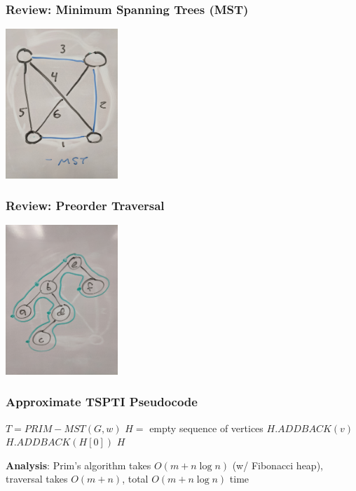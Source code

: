 \documentclass{beamer}
\begin{document}
\begin{frame} \frametitle{Review: Minimum Spanning Trees (MST)}
  \begin{center}
    \includegraphics[height=160pt]{13-mst.jpg}
  \end{center}
\end{frame}

\begin{frame} \frametitle{Review: Preorder Traversal}
  \begin{center}
    \includegraphics[height=160pt]{13-preorder.jpg}
  \end{center}
\end{frame}

\begin{frame} \frametitle{Approximate TSPTI Pseudocode}
  \begin{algorithmic}[1]
      \State $T = PRIM-MST(G, w)$
      \State $H = $ empty sequence of vertices
        \State $H.ADDBACK(v)$
      \EndFor
      \State $H.ADDBACK(H[0])$
      \State \Return $H$
    \EndFunction
  \end{algorithmic}
\vspace{.5 cm}
\textbf{Analysis}: Prim's algorithm takes $O(m + n \log n)$ (w/ Fibonacci heap),
traversal takes $O(m + n)$, total $O(m + n \log n)$ time
\end{frame}
\end{document}
